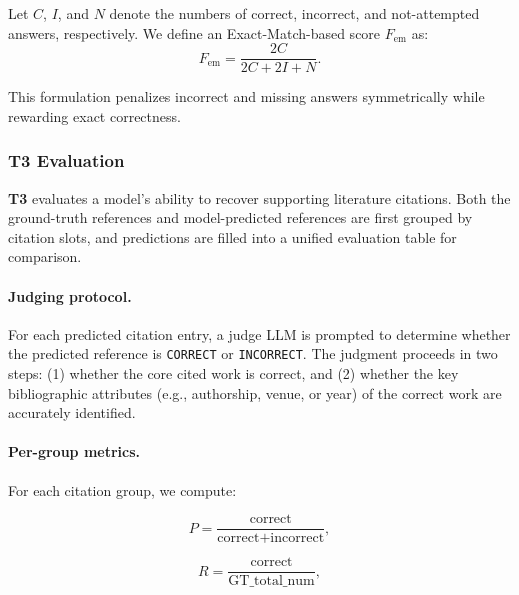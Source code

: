 
Let $C$, $I$, and $N$ denote the numbers of correct, incorrect, and not-attempted answers, respectively. We define an Exact-Match-based score $F_{\text{em}}$ as:
\begin{equation}
F_{\text{em}} = \frac{2C}{2C + 2I + N}.
\end{equation}

This formulation penalizes incorrect and missing answers symmetrically while rewarding exact correctness.

\subsubsection{T3 Evaluation}

\noindent \textbf{T3} evaluates a model’s ability to recover supporting literature citations.
Both the ground-truth references and model-predicted references are first grouped by citation slots, and predictions are filled into a unified evaluation table for comparison.

\paragraph{Judging protocol.}
For each predicted citation entry, a judge LLM is prompted to determine whether the predicted reference is \texttt{CORRECT} or \texttt{INCORRECT}.
The judgment proceeds in two steps:
(1) whether the core cited work is correct, and
(2) whether the key bibliographic attributes (e.g., authorship, venue, or year) of the correct work are accurately identified.

\paragraph{Per-group metrics.}
For each citation group, we compute:

\begin{equation}
P = \frac{\text{correct}}{\text{correct} + \text{incorrect}},
\end{equation}

\begin{equation}
R = \frac{\text{correct}}{\text{GT\_total\_num}},
\end{equation}

